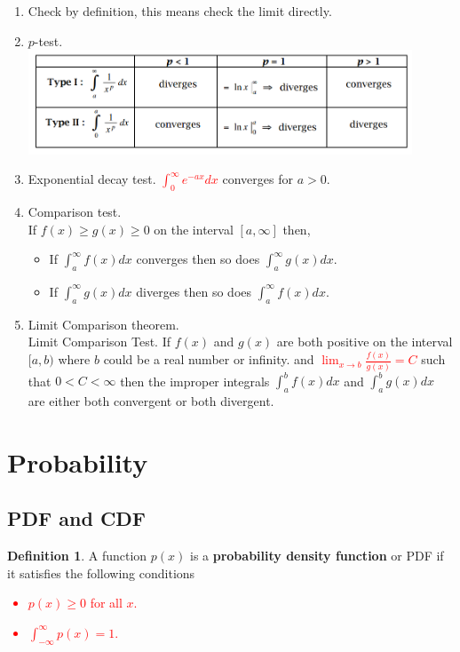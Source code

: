 \documentclass[12pt]{article}
\theoremstyle{definition}
\theoremstyle{definition}
\newtheorem{definition}{Definition}[section]
\theoremstyle{remark}
\theoremstyle{definition}
\theoremstyle{definition}
\theoremstyle{definition}
\begin{document}
\begin{enumerate}
	\item Check by definition, this means check the limit directly.
	\item $p$-test.\\
	\includegraphics*[width=0.9\textwidth]{1.png}
	\item Exponential decay test. 
	\textcolor{red}{$\int^\infty_0 e^{-ax} dx$} converges for $a>0$.
	\item Comparison test.\\
	If $f(x)\geq g(x) \geq 0$ on the interval $[a,\infty]$ then,\begin{itemize}
	\item If $\int^\infty_a f(x) dx$ converges then so does $\int^\infty_a g(x) dx$.
	\item If $\int^\infty_a g(x) dx$ diverges then so does $\int^\infty_a f(x) dx$.
	\end{itemize}
	\item Limit Comparison theorem.\\
	Limit Comparison Test. If $f(x)$ and $g(x)$ are both positive  on the interval $[a,b)$ where $b$ could be a real number or infinity.
	and
	\textcolor{red}{$\lim_{x\to b}\frac{f(x)}{g(x)} = C$} such that $0 < C < \infty$
	then the improper integrals $\int^b_a f(x) dx$ and $\int^b_a g(x) dx$ are either both convergent or both divergent.

\end{enumerate}

\section{Probability}
\subsection{PDF and CDF}
\begin{definition}
A function $p(x)$ is a \textbf{probability density function} or PDF if it satisfies the following conditions
\textcolor{red}{\begin{itemize}
\item $p(x) \geq 0$ for all $x$.
\item $\int_{-\infty}^\infty p(x) = 1.$
\end{itemize}}
\end{definition}
\end{document}
